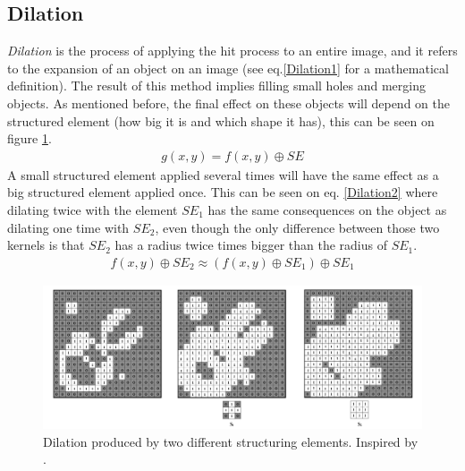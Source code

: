 \subsection{Dilation}
\textit{Dilation} is the process of applying the hit process to an entire image, and it refers to the expansion of an object on an image (see eq.\ref{Dilation1} for a mathematical definition). The result of this method implies filling small holes and merging objects. As mentioned before, the final effect on these objects will depend on the structured element (how big it is and which shape it has), this can be seen on figure \ref{fig:Dilation}. 
\begin{equation}
\begin{aligned}
{g(x, y)}={f(x,y)}\oplus{SE}
\label{Dilation1}
	\end{aligned}
\end{equation}
A small structured element applied several times will have the same effect as a big structured element applied once. This can be seen on eq. \ref{Dilation2} where dilating twice with the element {$SE_{1}$} has the same consequences on the object as dilating one time with {$SE_{2}$}, even though the only difference between those two kernels is that {$SE_{2}$} has a radius twice times bigger than the radius of {$SE_{1}$}.
\begin{equation}
\begin{aligned}
{f(x,y)}\oplus{SE_{2}} \approx ({f(x,y)}\oplus{SE_{1}})\oplus{SE_{1}}
\label{Dilation2}
	\end{aligned}
\end{equation}
\begin{figure}[htbp]
\centering
\includegraphics[width=1\textwidth]{Pictures/Theory/Dilation.png}
\caption{Dilation produced by two different structuring elements. Inspired by \citep{ip_book}.}
\label{fig:Dilation}
\end{figure}

